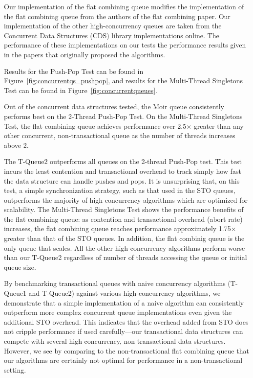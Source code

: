  Our implementation of the flat combining queue modifies the implementation of the flat combining queue from the authors of the flat combining paper\cite{flatcombining}. Our implementation of the other high-concurrency queues are taken from the Concurrent Data Structures (CDS) library implementations online\cite{libcds}. The performance of these implementations on our tests the performance results given in the papers that originally proposed the algorithms.

 Results for the Push-Pop Test can be found in Figure~\ref{fig:concurrentqs_pushpop}, and results for the Multi-Thread Singletons Test can be found in Figure~\ref{fig:concurrentqueues}.

Out of the concurrent data structures tested, the Moir queue\cite{queue2} consistently performs best on the 2-Thread Push-Pop Test. On the Multi-Thread Singletons Test, the flat combining queue achieves performance over 2.5$\times$ greater than any other concurrent, non-transactional queue as the number of threads increases above 2.

The T-Queue2 outperforms all queues on the 2-thread Push-Pop test. This test incurs the least contention and transactional overhead to track simply how fast the data structure can handle pushes and pops. It is unsurprising that, on this test, a simple synchronization strategy, such as that used in the STO queues, outperforms the majority of high-concurrency algorithms which are optimized for scalability. The Multi-Thread Singletons Test shows the performance benefits of the flat combining queue: as contention and transactional overhead (abort rate) increases, the flat combining queue reaches performance approximately 1.75$\times$ greater than that of the STO queues. In addition, the flat combinig queue is the only queue that scales. All the other high-concurrency algorithms perform worse than our T-Queue2 regardless of number of threads accessing the queue or initial queue size.

By benchmarking transactional queues with naive concurrency algorithms (T-Queue1 and T-Queue2) against various high-concurrency algorithms, we demonstrate that a simple implementation of a naive algorithm can consistently outperform more complex concurrent queue implementations even given the additional STO overhead. This indicates that the overhead added from STO does not cripple performance if used carefully---our transactional data structures can compete with several high-concurrency, non-transactional data structures. However, we see by comparing to the non-transactional flat combining queue that our algorithms are certainly not optimal for performance in a non-transactional setting.

